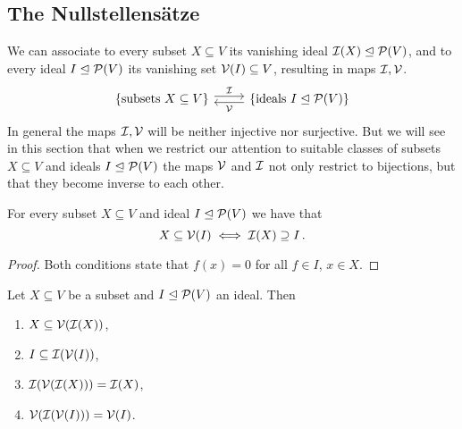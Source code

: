 \subsection{The Nullstellensätze}


\begin{fluff}
  We can associate to every subset $X \subseteq V$ its vanishing ideal $\mathcal{I}(X) \trianglelefteq \mathcal{P}(V)$, and to every ideal $I \trianglelefteq \mathcal{P}(V)$ its vanishing set $\mathcal{V}(I) \subseteq V$, resulting in maps $\mathcal{I}, \mathcal{V}$.
  \[
    \begin{tikzcd}
        \{ \text{subsets $X \subseteq V$} \}
        \arrow[shift left]{r}[above]{\mc{I}}
      & \{ \text{ideals $I \idealeq \mc{P}(V)$} \}
        \arrow[shift left]{l}[below]{\mc{V}}
    \end{tikzcd}
  \]
  In general the maps $\mathcal{I}, \mathcal{V}$ will be neither injective nor surjective.
  But we will see in this section that when we restrict our attention to suitable classes of subsets $X \subseteq V$ and ideals $I \trianglelefteq \mathcal{P}(V)$ the maps $\mathcal{V}$ and $\mathcal{I}$ not only restrict to bijections, but that they become inverse to each other.
\end{fluff}


\begin{lemma}
  \label{lemma: galois connection for vanishing ideals and zero sets}
  For every subset $X \subseteq V$ and ideal $I \trianglelefteq \mathcal{P}(V)$ we have that
  \[
          X \subseteq \mathcal{V}(I)
    \iff  \mathcal{I}(X) \supseteq I \,.
  \]
\end{lemma}


\begin{proof}
  Both conditions state that $f(x) = 0$ for all $f \in I$, $x \in X$.
\end{proof}


\begin{corollary}
  \label{corollary: properties of V and I}
  Let $X \subseteq V$ be a subset and $I \trianglelefteq \mathcal{P}(V)$ an ideal.
  Then
  \begin{enumerate}
    \item
      $X \subseteq \mathcal{V}(\mathcal{I}(X))$,
    \item
      $I \subseteq \mathcal{I}(\mathcal{V}(I))$,
    \item
      $\mathcal{I}(\mathcal{V}(\mathcal{I}(X))) = \mathcal{I}(X)$,
    \item
      $\mathcal{V}(\mathcal{I}(\mathcal{V}(I))) = \mathcal{V}(I)$.
  \end{enumerate}
\end{corollary}


